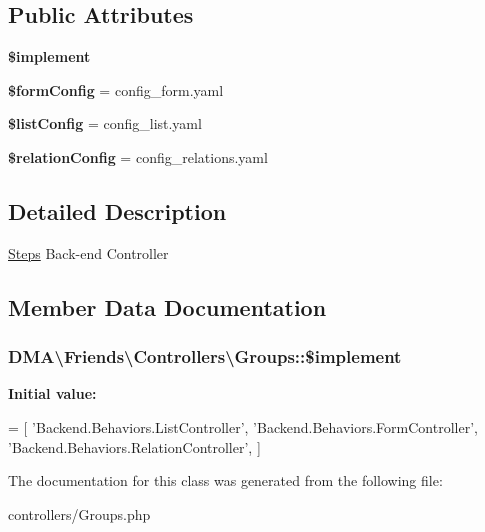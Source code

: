 \subsection*{Public Attributes}
\begin{DoxyCompactItemize}
\item 
{\bfseries \$implement}
\item 
\hypertarget{classDMA_1_1Friends_1_1Controllers_1_1Groups_a6eecdf56ed0bb93cd693c06aa945a87b}{}{\bfseries \$form\+Config} = \textquotesingle{}config\+\_\+form.\+yaml\textquotesingle{}\label{classDMA_1_1Friends_1_1Controllers_1_1Groups_a6eecdf56ed0bb93cd693c06aa945a87b}

\item 
\hypertarget{classDMA_1_1Friends_1_1Controllers_1_1Groups_a8cae966221f95dfbba825e1ffde46049}{}{\bfseries \$list\+Config} = \textquotesingle{}config\+\_\+list.\+yaml\textquotesingle{}\label{classDMA_1_1Friends_1_1Controllers_1_1Groups_a8cae966221f95dfbba825e1ffde46049}

\item 
\hypertarget{classDMA_1_1Friends_1_1Controllers_1_1Groups_a1dee3b5ab935f5c8b420f03d4d17f536}{}{\bfseries \$relation\+Config} = \textquotesingle{}config\+\_\+relations.\+yaml\textquotesingle{}\label{classDMA_1_1Friends_1_1Controllers_1_1Groups_a1dee3b5ab935f5c8b420f03d4d17f536}

\end{DoxyCompactItemize}


\subsection{Detailed Description}
\hyperlink{classDMA_1_1Friends_1_1Controllers_1_1Steps}{Steps} Back-\/end Controller 

\subsection{Member Data Documentation}
\hypertarget{classDMA_1_1Friends_1_1Controllers_1_1Groups_aa0c5c09b0b7f0628a1001a8397626577}{}
\subsubsection[{\$implement}]{\setlength{\rightskip}{0pt plus 5cm}D\+M\+A\textbackslash{}\+Friends\textbackslash{}\+Controllers\textbackslash{}\+Groups\+::\$implement}\label{classDMA_1_1Friends_1_1Controllers_1_1Groups_aa0c5c09b0b7f0628a1001a8397626577}
{\bfseries Initial value\+:}
\begin{DoxyCode}
= [
        \textcolor{stringliteral}{'Backend.Behaviors.ListController'},    
        \textcolor{stringliteral}{'Backend.Behaviors.FormController'},
        \textcolor{stringliteral}{'Backend.Behaviors.RelationController'},
    ]
\end{DoxyCode}


The documentation for this class was generated from the following file\+:\begin{DoxyCompactItemize}
\item 
controllers/Groups.\+php\end{DoxyCompactItemize}
